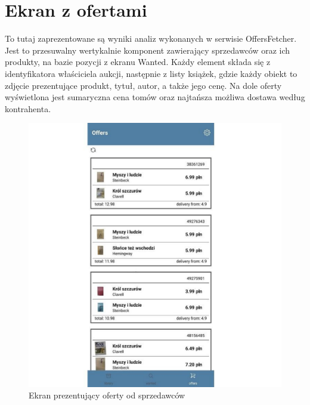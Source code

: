 \section{Ekran z ofertami}
To tutaj zaprezentowane są wyniki analiz wykonanych w serwisie OffersFetcher.\\ Jest to przesuwalny wertykalnie komponent zawierający sprzedawców oraz ich produkty, na bazie pozycji z ekranu Wanted. Każdy element składa się z identyfikatora właściciela aukcji, następnie z listy książek, gdzie każdy obiekt to zdjęcie prezentujące produkt, tytuł, autor, a także jego cenę. Na dole oferty wyświetlona jest sumaryczna cena tomów oraz najtańsza możliwa dostawa według kontrahenta.
\begin{figure}[H]
	\centering
	\includegraphics[width=\linewidth]{offers.pdf}
	\caption{Ekran prezentujący oferty od sprzedawców}
\end{figure}
\newpage

